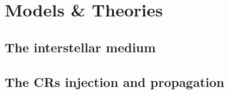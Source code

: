 \section{Models \& Theories}


    \subsection{The interstellar medium}


    \subsection{The CRs injection and propagation}